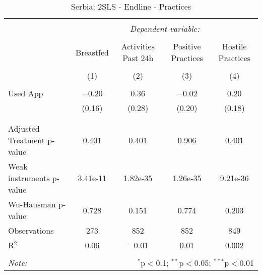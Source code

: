 
\begin{table}[!htbp] \centering 
  \caption{Serbia: 2SLS - Endline - Practices} 
  \label{tbl:Serbia: 2SLS - Endline - Practices} 
\begin{tabular}{@{\extracolsep{5pt}}lcccc} 
\\[-1.8ex]\hline 
\hline \\[-1.8ex] 
 & \multicolumn{4}{c}{\textit{Dependent variable:}} \\ 
\cline{2-5} 
\\[-1.8ex] & Breastfed & Activities Past 24h & Positive Practices & Hostile Practices \\ 
\\[-1.8ex] & (1) & (2) & (3) & (4)\\ 
\hline \\[-1.8ex] 
 Used App & $-$0.20 & 0.36 & $-$0.02 & 0.20 \\ 
  & (0.16) & (0.28) & (0.20) & (0.18) \\ 
  & & & & \\ 
\hline \\[-1.8ex] 
Adjusted Treatment p-value & 0.401 & 0.401 & 0.906 & 0.401 \\ 
Weak instruments p-value & 3.41e-11 & 1.82e-35 & 1.26e-35 & 9.21e-36 \\ 
Wu-Hausman p-value & 0.728 & 0.151 & 0.774 & 0.203 \\ 
Observations & 273 & 852 & 852 & 849 \\ 
R$^{2}$ & 0.06 & $-$0.01 & 0.01 & 0.002 \\ 
\hline 
\hline \\[-1.8ex] 
\textit{Note:}  & \multicolumn{4}{r}{$^{*}$p$<$0.1; $^{**}$p$<$0.05; $^{***}$p$<$0.01} \\ 
\end{tabular} 
\end{table} 
